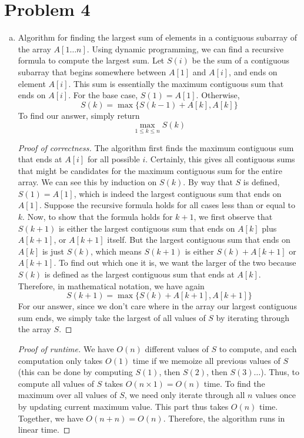 \documentclass{article}
\begin{document}
\section*{Problem 4}
\begin{enumerate}[(a)]
\item Algorithm for finding the largest sum of elements in a contiguous subarray of the array $A[1 \dots n]$. Using dynamic programming, we can find a recursive formula to compute the largest sum. Let $S(i)$ be the sum of a contiguous subarray that begins somewhere between $A[1]$ and $A[i]$, and ends on element $A[i]$. This sum is essentially the maximum contiguous sum that ends on $A[i]$. For the base case, $S(1)=A[1]$. Otherwise,
$$S(k) = \max\{S(k-1)+A[k], A[k]\}$$
To find our answer, simply return
$$\max_{1\leq k \leq n} S(k)$$

\begin{proof}[Proof of correctness]
The algorithm first finds the maximum contiguous sum that ends at $A[i]$ for all possible $i$. Certainly, this gives all contiguous sums that might be candidates for the maximum contiguous sum for the entire array. We can see this by induction on $S(k)$. By way that $S$ is defined, $S(1)=A[1]$, which is indeed the largest contiguous sum that ends on $A[1]$. Suppose the recursive formula holds for all cases less than or equal to $k$. Now, to show that the formula holds for $k+1$, we first observe that $S(k+1)$ is either the largest contiguous sum that ends on $A[k]$ plus $A[k+1]$, or $A[k+1]$ itself. But the largest contiguous sum that ends on $A[k]$ is just $S(k)$, which means $S(k+1)$ is either $S(k)+A[k+1]$ or $A[k+1]$. To find out which one it is, we want the larger of the two because $S(k)$ is defined as the largest contiguous sum that ends at $A[k]$. Therefore, in mathematical notation, we have again
$$S(k+1) = \max\{S(k)+A[k+1], A[k+1]\}$$
For our answer, since we don't care where in the array our largest contiguous sum ends, we simply take the largest of all values of $S$ by iterating through the array $S$.
\end{proof}

\begin{proof}[Proof of runtime]
We have $O(n)$ different values of $S$ to compute, and each computation only takes $O(1)$ time if we memoize all previous values of $S$ (this can be done by computing $S(1)$, then $S(2)$, then $S(3) \dots$). Thus, to compute all values of $S$ takes $O(n\times 1)=O(n)$ time. To find the maximum over all values of $S$, we need only iterate through all $n$ values once by updating current maximum value. This part thus takes $O(n)$ time. Together, we have $O(n+n)=O(n)$. Therefore, the algorithm runs in linear time.
\end{proof}



\end{enumerate}
\end{document}
